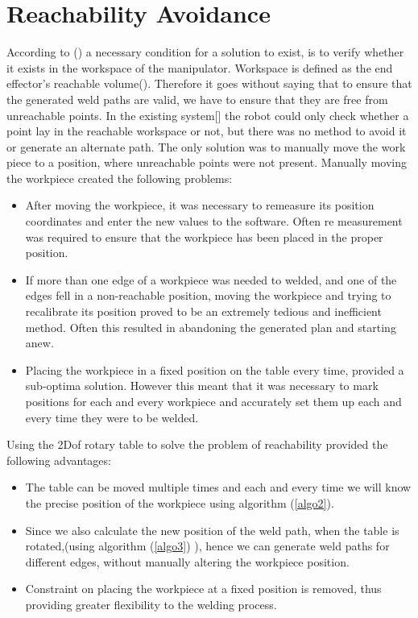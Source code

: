 \section{Reachability Avoidance}
According to (\citet{craig2005introduction}) a necessary condition for a solution to exist, is to verify whether it exists in the workspace of the manipulator. Workspace is defined as the end effector's reachable volume(\citet{craig2005introduction}). Therefore it goes without saying that to ensure that the generated weld paths are valid, we have to ensure that they are free from unreachable points. In the existing system[\citet{DiazP2016}] the robot could only check whether a point lay in the reachable workspace or not, but there was no method to avoid it or generate an alternate path. The only solution was to manually move the work piece to a position, where unreachable points were not present. Manually moving the workpiece created the following problems:
\begin{itemize}
	\item After moving the workpiece, it was necessary to remeasure its position coordinates and enter the new values to the software. Often re measurement was required to ensure that the workpiece has been placed in the proper position.
	\item If more than one edge of a workpiece was needed to welded, and one of the edges fell in a non-reachable position, moving the workpiece and trying to recalibrate its position proved to be an extremely tedious and inefficient method. Often this resulted in abandoning the generated plan and starting anew.
	\item Placing the workpiece in a fixed position on the table every time, provided a sub-optima solution. However this meant that it was necessary to mark positions for each and every workpiece and accurately set them up each and every time they were to be welded.	
\end{itemize} 

Using the 2Dof rotary table to solve the problem of reachability provided the following advantages:
\begin{itemize}
	\item The table can be moved multiple times and each and every time we will know the precise position of the workpiece using algorithm (\ref{algo2}).
	\item Since we also calculate the new position of the weld path, when the table is rotated,(using algorithm (\ref{algo3}) ), hence we can generate weld paths for different edges, without manually altering the workpiece position.
	\item Constraint on placing the workpiece at a fixed position is removed, thus providing greater flexibility to the welding process.
\end{itemize}
